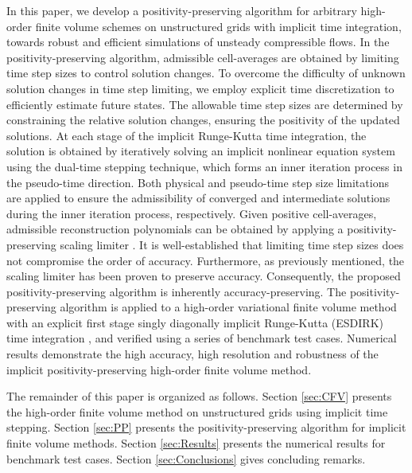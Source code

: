 In this paper, we develop a positivity-preserving algorithm for arbitrary high-order finite volume schemes on unstructured grids with implicit time integration, towards robust and efficient simulations of unsteady compressible flows.
In the positivity-preserving algorithm, admissible cell-averages are obtained by limiting time step sizes to control solution changes. To overcome the difficulty of unknown solution changes in time step limiting, we employ explicit time discretization to efficiently estimate future states. 
The allowable time step sizes are determined by constraining the relative solution changes, ensuring the positivity of the updated solutions. At each stage of the implicit Runge-Kutta time integration, the solution is obtained by iteratively solving an implicit nonlinear equation system using the dual-time stepping technique, which forms an inner iteration process in the pseudo-time direction. Both physical and pseudo-time step size limitations are applied to ensure the admissibility of converged and intermediate solutions during the inner iteration process, respectively.
Given positive cell-averages, admissible reconstruction polynomials can be obtained by applying a positivity-preserving scaling limiter \cite{zhang2010positivity}. It is well-established that limiting time step sizes does not compromise the order of accuracy. Furthermore, as previously mentioned, the scaling limiter has been proven to preserve accuracy. Consequently, the proposed positivity-preserving algorithm is inherently accuracy-preserving. 
The positivity-preserving algorithm is applied to a high-order variational finite volume method \cite{wang2017compact_VR} with an explicit first stage singly diagonally implicit Runge-Kutta (ESDIRK) time integration \cite{bijl2002implicitBDFvESDIRK}, and verified using a series of benchmark test cases. Numerical results demonstrate the high accuracy, high resolution and robustness of the implicit positivity-preserving high-order finite volume method.

The remainder of this paper is organized as follows. Section \ref{sec:CFV} presents the high-order finite volume method on unstructured grids using implicit time stepping. Section \ref{sec:PP} presents the positivity-preserving algorithm for implicit finite volume methods.
Section \ref{sec:Results} presents the numerical results for benchmark test cases. Section \ref{sec:Conclusions} gives concluding remarks.

